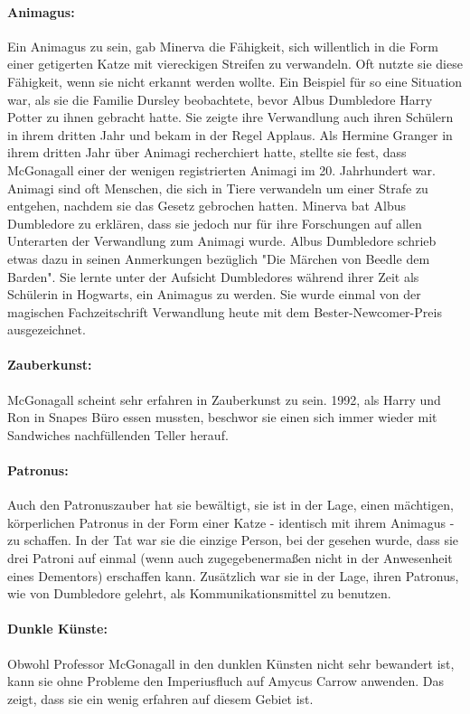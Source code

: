 \documentclass[a4paper, 10pt]{article}
\begin{document}
\paragraph{Animagus:}  
Ein Animagus zu sein, gab Minerva die Fähigkeit, sich willentlich in die Form einer getigerten Katze mit viereckigen Streifen zu verwandeln. Oft nutzte sie diese Fähigkeit, wenn sie nicht erkannt werden wollte. Ein Beispiel für so eine Situation war, als sie die Familie Dursley beobachtete, bevor Albus Dumbledore Harry Potter zu ihnen gebracht hatte. Sie zeigte ihre Verwandlung auch ihren Schülern in ihrem dritten Jahr und bekam in der Regel Applaus. Als Hermine Granger in ihrem dritten Jahr über Animagi recherchiert hatte, stellte sie fest, dass McGonagall einer der wenigen registrierten Animagi im 20.
Jahrhundert war. Animagi sind oft Menschen, die sich in Tiere verwandeln um einer Strafe zu entgehen, nachdem sie das Gesetz gebrochen hatten. Minerva bat Albus Dumbledore zu erklären, dass sie jedoch nur für ihre Forschungen auf allen Unterarten der Verwandlung zum Animagi wurde. Albus Dumbledore schrieb etwas dazu in seinen Anmerkungen bezüglich "Die Märchen von Beedle dem Barden". Sie lernte unter der Aufsicht Dumbledores während ihrer Zeit als Schülerin in Hogwarts, ein Animagus zu werden. Sie wurde einmal von der magischen Fachzeitschrift Verwandlung heute mit dem Bester-Newcomer-Preis ausgezeichnet.
\paragraph{Zauberkunst:}
McGonagall scheint sehr erfahren in Zauberkunst zu sein. 1992, als Harry und Ron in Snapes Büro essen mussten, beschwor sie einen sich immer wieder mit Sandwiches nachfüllenden Teller herauf.
\paragraph{Patronus:} 
Auch den Patronuszauber hat sie bewältigt, sie ist in der Lage, einen mächtigen, körperlichen Patronus in der Form einer Katze - identisch mit ihrem Animagus - zu schaffen. In der Tat war sie die einzige Person, bei der gesehen wurde, dass sie drei Patroni auf einmal (wenn auch zugegebenermaßen nicht in der Anwesenheit eines Dementors) erschaffen kann. Zusätzlich war sie in der Lage, ihren Patronus, wie von Dumbledore gelehrt, als Kommunikationsmittel zu benutzen.
\paragraph{Dunkle Künste:} 
Obwohl Professor McGonagall in den dunklen Künsten nicht sehr bewandert ist, kann sie ohne Probleme den Imperiusfluch auf Amycus Carrow anwenden. Das zeigt, dass sie ein wenig erfahren auf diesem Gebiet ist.
\end{document}
